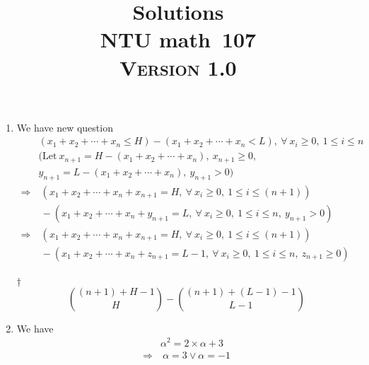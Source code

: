 \documentclass[a4paper,12pt]{article}
\newcommand{\school}{ntu}
\newcommand{\subject}{math}
\renewcommand{\year}{107}
\newcommand{\titlename}{\MakeUppercase{\school} \subject \ \year}
\newcommand{\ver}{\textsc{Version} 1.0} %
\begin{document}
\title{\LARGE{\textbf{Solutions}} \\
	\Huge{\textbf{\titlename}} \\
	\normalsize{\ver}
}
\author{}
\date{}

\maketitle


\begin{enumerate}
	\item We have new question \begin{equation}
        \begin{aligned}
            & (x_1 + x_2 + \cdots + x_n \le H) - (x_1 + x_2 + \cdots + x_n < L), \ \forall \ x_i \ge 0, \ 1 \le i \le n \\
            & (\text{Let} \ x_{n + 1} = H - (x_1 + x_2 + \cdots + x_n), \ x_{n + 1} \ge 0, \\
            & y_{n + 1} = L - (x_1 + x_2 + \cdots + x_n), \ y_{n + 1} > 0) \\
            \Rightarrow & \ (x_1 + x_2 + \cdots + x_n + x_{n + 1} = H, \ \forall \ x_i \ge 0, \ 1 \le i \le (n + 1)) \\
            & \ - (x_1 + x_2 + \cdots + x_n + y_{n + 1} = L, \ \forall \ x_i \ge 0, \ 1 \le i \le n, \ y_{n + 1} > 0) \\
            \Rightarrow & \ (x_1 + x_2 + \cdots + x_n + x_{n + 1} = H, \ \forall \ x_i \ge 0, \ 1 \le i \le (n + 1)) \\
            & \ - (x_1 + x_2 + \cdots + x_n + z_{n + 1} = L - 1, \ \forall \ x_i \ge 0, \ 1 \le i \le n, \ z_{n + 1} \ge 0) \\
        \end{aligned}
    \end{equation}
    \begin{answer}{$\dag$}\begin{equation}
            \binom{(n + 1) + H - 1}{H} - \binom{(n + 1) + (L - 1) - 1}{L - 1}
        \end{equation}
    \end{answer}
    \item We have \begin{equation}
        \begin{aligned}
            & \alpha^2 = 2 \times \alpha + 3 \\
            \Rightarrow & \ \alpha = 3 \lor \alpha = -1 \\

\end{aligned}
\end{equation}
\end{enumerate}
\end{document}
